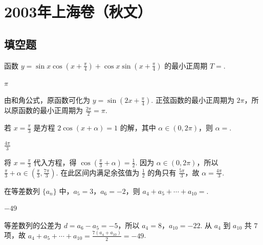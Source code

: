 \chapter{2003年上海卷（秋文）}
\section{填空题}
\begin{problem}
函数 \( y = \sin x \cos \left( x + \frac{\pi}{4} \right) + \cos x \sin \left( x + \frac{\pi}{4} \right) \) 的最小正周期 \( T = \)\fillinblank{}.
\end{problem}

\begin{answer}
\(\pi\)
\end{answer}

\begin{solution}
由和角公式，原函数可化为 \(y=\sin\left(2x+\frac{\pi}{4}\right)\). 正弦函数的最小正周期为 \(2\pi\)，所以原函数的最小正周期为 \(\frac{2\pi}{2}=\pi\).
\end{solution}

\begin{problem}
若 \(x = \frac{\pi}{3}\) 是方程 \(2\cos (x + \alpha) = 1\) 的解，其中 \(\alpha \in (0,2\pi)\)，则 \(\alpha = \)\fillinblank{}.
\end{problem}

\begin{answer}
\(\frac{4\pi}{3}\)
\end{answer}

\begin{solution}
将 \(x=\frac{\pi}{3}\) 代入方程，得 \(\cos\left(\frac{\pi}{3}+\alpha\right)=\frac{1}{2}\). 因为 \(\alpha\in(0,2\pi)\)，所以 \(\frac{\pi}{3}+\alpha\in\left(\frac{\pi}{3},\frac{7\pi}{3}\right)\). 在此区间内满足余弦值为 \(\frac{1}{2}\) 的角只有 \(\frac{5\pi}{3}\)，故 \(\alpha=\frac{4\pi}{3}\).
\end{solution}

\begin{problem}
在等差数列 \(\{a_{n}\}\) 中，\(a_{5} = 3\)，\(a_{6} = -2\)，则 \(a_{4} + a_{5} + \cdots + a_{10} = \)\fillinblank{}.
\end{problem}

\begin{answer}
\(-49\)
\end{answer}

\begin{solution}
等差数列的公差为 \(d=a_6-a_5=-5\)，所以 \(a_4=8\)，\(a_{10}=-22\). 从 \(a_4\) 到 \(a_{10}\) 共 \(7\) 项，故 \(a_4+a_5+\cdots+a_{10}=\frac{7(a_4+a_{10})}{2}=-49\).
\end{solution}

